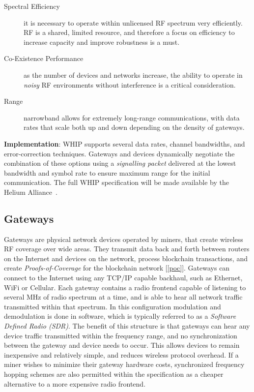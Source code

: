 \documentclass[letterpaper,11pt]{article}
\begin{document}
\begin{description}
  \item[Spectral Efficiency] it is necessary to operate within unlicensed RF spectrum very efficiently. RF is a shared, limited resource, and therefore a focus on efficiency to increase capacity and improve robustness is a must.
  \item[Co-Existence Performance] as the number of devices and networks increase, the ability to operate in \emph{noisy} RF environments without interference is a critical consideration.
  \item[Range] narrowband allows for extremely long-range communications, with data rates that scale both up and down depending on the density of gateways.
\end{description}

\textbf{Implementation}: WHIP supports several data rates, channel bandwidths, and error-correction techniques. Gateways and devices dynamically negotiate the combination of these options using a \emph{signalling packet} delivered at the lowest bandwidth and symbol rate to ensure maximum range for the initial communication.
The full WHIP specification will be made available by the Helium Alliance~\cite{alliance}.

\subsection{Gateways}\label{gateways}

Gateways are physical network devices operated by miners, that create wireless RF coverage over wide areas. They transmit data back and forth between routers on the Internet and devices on the network, process blockchain transactions, and create \emph{Proofs-of-Coverage} for the blockchain network [\ref{poc}]. Gateways can connect to the Internet using any TCP/IP capable backhaul, such as Ethernet, WiFi or Cellular. Each gateway contains a radio frontend capable of listening to several MHz of radio spectrum at a time, and is able to hear all network traffic transmitted within that spectrum. In this configuration modulation and demodulation is done in software, which is typically referred to as a \emph{Software Defined Radio (SDR)}. The benefit of this structure is that gateways can hear any device traffic transmitted within the frequency range, and no synchronization between the gateway and device needs to occur. This allows devices to remain inexpensive and relatively simple, and reduces wireless protocol overhead. If a miner wishes to minimize their gateway hardware costs, synchronized frequency hopping schemes are also permitted within the specification as a cheaper alternative to a more expensive radio frontend.
\end{document}
